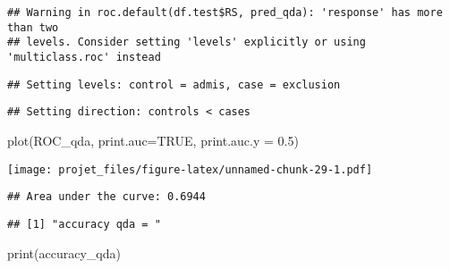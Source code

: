\documentclass[
]{article}
\newenvironment{Shaded}{\begin{snugshade}}{\end{snugshade}}
\newcommand{\AttributeTok}[1]{\textcolor[rgb]{0.77,0.63,0.00}{#1}}
\newcommand{\CommentTok}[1]{\textcolor[rgb]{0.56,0.35,0.01}{\textit{#1}}}
\newcommand{\ConstantTok}[1]{\textcolor[rgb]{0.00,0.00,0.00}{#1}}
\newcommand{\FloatTok}[1]{\textcolor[rgb]{0.00,0.00,0.81}{#1}}
\newcommand{\FunctionTok}[1]{\textcolor[rgb]{0.00,0.00,0.00}{#1}}
\newcommand{\NormalTok}[1]{#1}
\newcommand{\OtherTok}[1]{\textcolor[rgb]{0.56,0.35,0.01}{#1}}
\newcommand{\SpecialCharTok}[1]{\textcolor[rgb]{0.00,0.00,0.00}{#1}}
\newcommand{\StringTok}[1]{\textcolor[rgb]{0.31,0.60,0.02}{#1}}
\begin{document}
\begin{verbatim}
## Warning in roc.default(df.test$RS, pred_qda): 'response' has more than two
## levels. Consider setting 'levels' explicitly or using 'multiclass.roc' instead
\end{verbatim}

\begin{verbatim}
## Setting levels: control = admis, case = exclusion
\end{verbatim}

\begin{verbatim}
## Setting direction: controls < cases
\end{verbatim}

\begin{Shaded}
\begin{Highlighting}[]
\FunctionTok{plot}\NormalTok{(ROC\_qda, }\AttributeTok{print.auc=}\ConstantTok{TRUE}\NormalTok{,  }\AttributeTok{print.auc.y =} \FloatTok{0.5}\NormalTok{)}
\end{Highlighting}
\end{Shaded}

\texttt{[image: projet\_files/figure-latex/unnamed-chunk-29-1.pdf]}

\begin{Shaded}
\end{Shaded}

\begin{verbatim}
## Area under the curve: 0.6944
\end{verbatim}

\begin{Shaded}
\end{Shaded}

\begin{verbatim}
## [1] "accuracy qda = "
\end{verbatim}

\begin{Shaded}
\begin{Highlighting}[]
\FunctionTok{print}\NormalTok{(accuracy\_qda)}
\end{Highlighting}
\end{Shaded}
\end{document}
